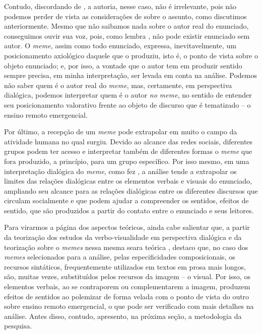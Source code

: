 \documentclass[portuguese]{textolivre}
\begin{document}
Contudo, discordando de \textcite{lara2020meme}, a autoria, nesse caso, não é irrelevante, pois não podemos perder de vista as considerações de \textcite{bakhtin2016generos} sobre o assunto, como discutimos anteriormente. Mesmo que não saibamos nada sobre o autor real do enunciado, conseguimos ouvir sua voz, pois, como lembra \textcite{bakhtin2016generos}, não pode existir enunciado sem autor. O \textit{meme}, assim como todo enunciado, expressa, inevitavelmente, um posicionamento axiológico daquele que o produziu, isto é, o ponto de vista sobre o objeto enunciado; e, por isso, a vontade que o autor tem em produzir sentido sempre precisa, em minha interpretação, ser levada em conta na análise. Podemos não saber quem é o autor real do \textit{meme}, mas, certamente, em perspectiva dialógica, podemos interpretar quem é o autor \textit{no meme}, no sentido de entender seu posicionamento valorativo frente ao objeto de discurso que é tematizado – o ensino remoto emergencial.
	
Por último, a recepção de um \textit{meme} pode extrapolar em muito o campo da atividade humana no qual surgiu. Devido ao alcance das redes sociais, diferentes grupos podem ter acesso e interpretar também de diferentes formas o \textit{meme} que fora produzido, a princípio, para um grupo específico. Por isso mesmo, em uma interpretação dialógica do \textit{meme}, como fez \textcite{lima2022reflexao}, a análise tende a extrapolar os limites das relações dialógicas entre os elementos verbais e visuais do enunciado, ampliando seu alcance para as relações dialógicas entre os diferentes discursos que circulam socialmente e que podem ajudar a compreender os sentidos, efeitos de sentido, que são produzidos a partir do contato entre o enunciado e seus leitores.
	
Para virarmos a página dos aspectos teóricos, ainda cabe salientar que, a partir da teorização dos estudos da verbo-visualidade em perspectiva dialógica \cite{brait2013olhar} e da teorização sobre o \textit{memes} nessa mesma seara teórica \cite{silva2016memes,lara2020meme,lima2022reflexao,Bessa2023}, destaco que, no caso dos \textit{memes} selecionados para a análise, pelas especificidades composicionais, os recursos sintáticos, frequentemente utilizados em textos em prosa mais longos, são, muitas vezes, substituídos pelos recursos da imagem – o visual. Por isso, os elementos verbais, ao se contraporem ou complementarem a imagem, produzem efeitos de sentidos ao polemizar de forma velada com o ponto de vista do outro sobre ensino remoto emergencial, o que pode ser verificado com mais detalhes na análise. Antes disso, contudo, apresento, na próxima seção, a metodologia da pesquisa.
	
\end{document}

